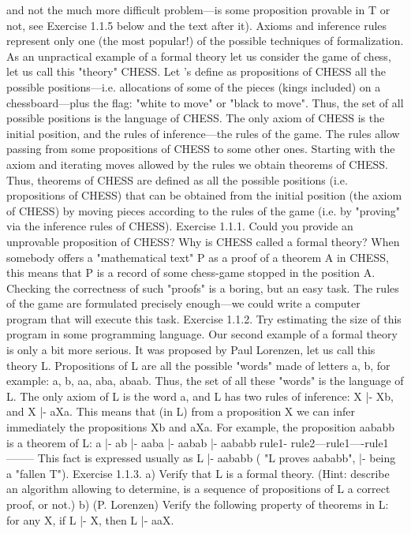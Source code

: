and not the much more difficult problem---is some proposition provable in T or not, see Exercise 1.1.5
below and the text after it).
Axioms and inference rules represent only one (the most popular!) of the possible techniques of
formalization.
As an unpractical example of a formal theory let us consider the game of chess, let us call this "theory"
CHESS. Let 's define as propositions of CHESS all the possible positions---i.e. allocations of some of the
pieces (kings included) on a chessboard---plus the flag: "white to move" or "black to move". Thus, the set
of all possible positions is the language of CHESS. The only axiom of CHESS is the initial position, and
the rules of inference---the rules of the game. The rules allow passing from some propositions of CHESS
to some other ones. Starting with the axiom and iterating moves allowed by the rules we obtain theorems
of CHESS. Thus, theorems of CHESS are defined as all the possible positions (i.e. propositions of
CHESS) that can be obtained from the initial position (the axiom of CHESS) by moving pieces according
to the rules of the game (i.e. by "proving" via the inference rules of CHESS).
Exercise 1.1.1. Could you provide an unprovable proposition of CHESS?
Why is CHESS called a formal theory? When somebody offers a "mathematical text" P as a proof of a
theorem A in CHESS, this means that P is a record of some chess-game stopped in the position A.
Checking the correctness of such "proofs" is a boring, but an easy task. The rules of the game are
formulated precisely enough---we could write a computer program that will execute this task.
Exercise 1.1.2. Try estimating the size of this program in some programming language.
Our second example of a formal theory is only a bit more serious. It was proposed by Paul Lorenzen, let
us call this theory L. Propositions of L are all the possible "words" made of letters a, b, for example: a, b,
aa, aba, abaab. Thus, the set of all these "words" is the language of L. The only axiom of L is the word
a, and L has two rules of inference: X |- Xb, and X |- aXa. This means that (in L) from a proposition X we
can infer immediately the propositions Xb and aXa. For example, the proposition aababb is a theorem of
L:
a |- ab |- aaba |- aabab |- aababb
rule1- rule2---rule1----rule1--------
This fact is expressed usually as L |- aababb ( "L proves aababb", |- being a "fallen T").
Exercise 1.1.3. a) Verify that L is a formal theory. (Hint: describe an algorithm allowing to determine, is a
sequence of propositions of L a correct proof, or not.)
b) (P. Lorenzen) Verify the following property of theorems in L: for any X, if L |- X, then L |- aaX.
